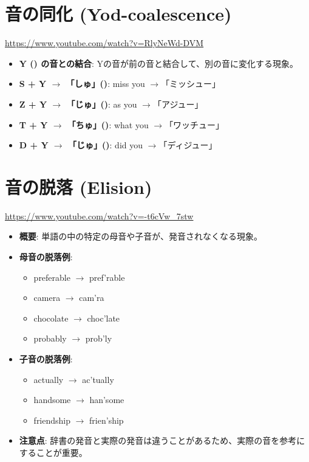 \documentclass{jlreq}
\begin{document}
\section{音の同化 (Yod-coalescence)}
\href{https://www.youtube.com/watch?v=RlyNeWd-DVM}{https://www.youtube.com/watch?v=RlyNeWd-DVM}
\begin{itemize}
    \item \textbf{Y (\textipa{[j]}) の音との結合}: Yの音が前の音と結合して、別の音に変化する現象。
    \item \textbf{S + Y $\to$ 「しゅ」(\textipa{[S]})}: miss you $\to$「ミッシュー」
    \item \textbf{Z + Y $\to$ 「じゅ」(\textipa{[Z]})}: as you $\to$「アジュー」
    \item \textbf{T + Y $\to$ 「ちゅ」(\textipa{[tS]})}: what you $\to$「ワッチュー」
    \item \textbf{D + Y $\to$ 「じゅ」(\textipa{[dZ]})}: did you $\to$「ディジュー」
\end{itemize}

\section{音の脱落 (Elision)}
\href{https://www.youtube.com/watch?v=-t6cVw_7stw}{https://www.youtube.com/watch?v=-t6cVw\_7stw}
\begin{itemize}
    \item \textbf{概要}: 単語の中の特定の母音や子音が、発音されなくなる現象。
    \item \textbf{母音の脱落例}:
    \begin{itemize}
        \item preferable $\to$ pref'rable
        \item camera $\to$ cam'ra
        \item chocolate $\to$ choc'late
        \item probably $\to$ prob'ly
    \end{itemize}
    \item \textbf{子音の脱落例}:
    \begin{itemize}
        \item actually $\to$ ac'tually
        \item handsome $\to$ han'some
        \item friendship $\to$ frien'ship
    \end{itemize}
    \item \textbf{注意点}: 辞書の発音と実際の発音は違うことがあるため、実際の音を参考にすることが重要。
\end{itemize}
\end{document}
